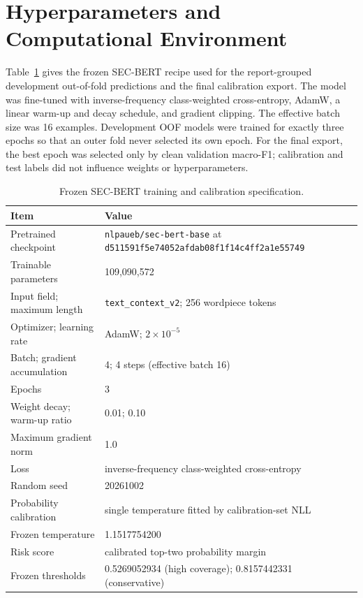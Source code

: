 \documentclass[11pt]{article}
\begin{document}
\section{Hyperparameters and Computational Environment}
\label{app:hyperparameters}

Table~\ref{tab:secbert-recipe} gives the frozen SEC-BERT recipe used for the
report-grouped development out-of-fold predictions and the final calibration
export. The model was fine-tuned with inverse-frequency class-weighted
cross-entropy, AdamW, a linear warm-up and decay schedule, and gradient clipping.
The effective batch size was 16 examples. Development OOF models were trained
for exactly three epochs so that an outer fold never selected its own epoch. For
the final export, the best epoch was selected only by clean validation macro-F1;
calibration and test labels did not influence weights or hyperparameters.

\begin{table}[ht]
  \centering
  \small
  \caption{Frozen SEC-BERT training and calibration specification.}
  \label{tab:secbert-recipe}
  \begin{tabular}{p{}p{}}
    \toprule
    Item & Value \\
    \midrule
    Pretrained checkpoint & \texttt{nlpaueb/sec-bert-base} at \texttt{d511591f5e74052afdab08f1f14c4ff2a1e55749} \\
    Trainable parameters & 109,090,572 \\
    Input field; maximum length & \texttt{text\_context\_v2}; 256 wordpiece tokens \\
    Optimizer; learning rate & AdamW; $2\times10^{-5}$ \\
    Batch; gradient accumulation & 4; 4 steps (effective batch 16) \\
    Epochs & 3 \\
    Weight decay; warm-up ratio & 0.01; 0.10 \\
    Maximum gradient norm & 1.0 \\
    Loss & inverse-frequency class-weighted cross-entropy \\
    Random seed & 20261002 \\
    Probability calibration & single temperature fitted by calibration-set NLL \\
    Frozen temperature & 1.1517754200 \\
    Risk score & calibrated top-two probability margin \\
    Frozen thresholds & 0.5269052934 (high coverage); 0.8157442331 (conservative) \\
    \bottomrule
  \end{tabular}
\end{table}
\end{document}
